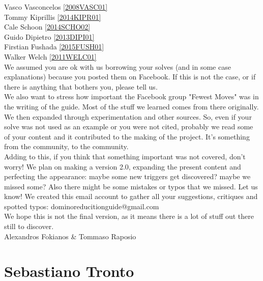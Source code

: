 \documentclass[11pt,a4paper]{book}
\begin{document}
Vasco Vasconcelos \href{https://www.worldcubeassociation.org/persons/2008VASC01}{[2008VASC01]}\\
Tommy Kiprillis \href{https://www.worldcubeassociation.org/persons/2014KIPR01}{[2014KIPR01]}\\
Cale Schoon \href{https://www.worldcubeassociation.org/persons/2014SCHO02}{[2014SCHO02]}\\
Guido Dipietro \href{https://www.worldcubeassociation.org/persons/2013DIPI01}{[2013DIPI01]}\\
Firstian Fushada \href{https://www.worldcubeassociation.org/persons/2015FUSH01}{[2015FUSH01]}\\
Walker Welch \href{https://www.worldcubeassociation.org/persons/2011WELC01} {[2011WELC01]}\\
\newline
We assumed you are ok with us borrowing your solves (and in some case explanations) because you posted them on Facebook. If this is not the case, or if there is anything that bothers you, please tell us. \\
We also want to stress how important the Facebook group "Fewest Moves" was in the writing of the guide. Most of the stuff we learned comes from there originally. We then expanded through experimentation and other sources. So, even if your solve was not used as an example or you were not cited, probably we read some of your content and it contributed to the making of the project. It's something from the community, to the community.\\
\newline
Adding to this, if you think that something important was not covered, don't worry! We plan on making a version 2.0, expanding the present content and perfecting the appearance: maybe some new triggers get discovered? maybe we missed some? Also there might be some mistakes or typos that we missed. Let us know! We created this email account to gather all your suggestions, critiques and spotted typos: dominoreducitionguide@gmail.com\\
\newline
We hope this is not the final version, as it means there is a lot of stuff out there still to discover.\\
\bigskip
\hfill Alexandros Fokianos \& Tommaso Raposio

\section{Sebastiano Tronto}
\end{document}
